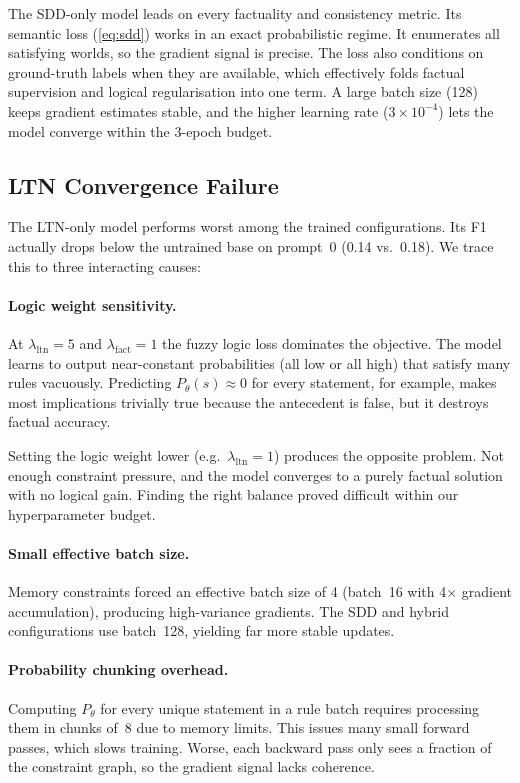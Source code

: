 \documentclass[11pt,a4paper]{article}
\begin{document}
The SDD-only model leads on every factuality and consistency metric.  Its
semantic loss (\cref{eq:sdd}) works in an exact probabilistic regime. It enumerates all satisfying worlds, so the gradient signal is
precise.  The loss also conditions on ground-truth labels when they are
available, which effectively folds factual supervision and logical
regularisation into one term.  A large batch size (128) keeps gradient
estimates stable, and the higher learning rate ($3{\times}10^{-4}$) lets
the model converge within the 3-epoch budget.

\subsection{LTN Convergence Failure}

The LTN-only model performs worst among the trained configurations.  Its
F1 actually drops below the untrained base on prompt~0
(0.14 vs.\ 0.18).  We trace this to three interacting causes:

\paragraph{Logic weight sensitivity.}
At $\lambda_{\text{ltn}}{=}5$ and $\lambda_{\text{fact}}{=}1$ the fuzzy
logic loss dominates the objective.  The model learns to output
near-constant probabilities (all low or all high) that satisfy many rules
vacuously.  Predicting $P_\theta(s){\approx}0$ for every statement, for
example, makes most implications trivially true because the antecedent is
false, but it destroys factual accuracy.

Setting the logic weight lower (e.g.\ $\lambda_{\text{ltn}}{=}1$)
produces the opposite problem. Not enough constraint pressure, and the
model converges to a purely factual solution with no logical gain.
Finding the right balance proved difficult within our hyperparameter
budget.

\paragraph{Small effective batch size.}
Memory constraints forced an effective batch size of 4 (batch~16 with
4$\times$ gradient accumulation), producing high-variance gradients.
The SDD and hybrid configurations use batch~128, yielding far more stable
updates.

\paragraph{Probability chunking overhead.}
Computing $P_\theta$ for every unique statement in a rule batch requires
processing them in chunks of~8 due to memory limits.  This issues many
small forward passes, which slows training.  Worse, each backward pass
only sees a fraction of the constraint graph, so the gradient signal
lacks coherence.
\end{document}
